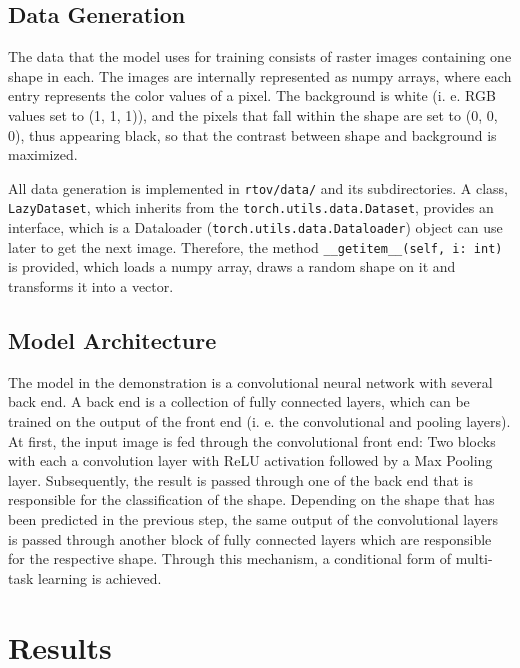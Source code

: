 \documentclass[12pt, a4paper, titlepage]{report}
\begin{document}
\section{Data Generation}

The data that the model uses for training consists of raster images containing one shape in each. The images are internally represented as numpy arrays, where each entry represents the color values of a pixel. The background is white (i. e. RGB values set to (1, 1, 1)), and the pixels that fall within the shape are set to (0, 0, 0), thus appearing black, so that the contrast between shape and background is maximized.

All data generation is implemented in \lstinline{rtov/data/} and its subdirectories. A class, \lstinline{LazyDataset}, which inherits from the \lstinline{torch.utils.data.Dataset}, provides an interface, which is a Dataloader (\lstinline{torch.utils.data.Dataloader}) object can use later to get the next image. Therefore, the method \lstinline{__getitem__(self, i: int)} is provided, which loads a numpy array, draws a random shape on it and transforms it into a vector.

\section{Model Architecture}

The model in the demonstration is a convolutional neural network with several back end. A back end is a collection of fully connected layers, which can be trained on the output of the front end (i. e. the convolutional and pooling layers). At first, the input image is fed through the convolutional front end: Two blocks with each a convolution layer with ReLU activation followed by a Max Pooling layer. Subsequently, the result is passed through one of the back end that is responsible for the classification of the shape. Depending on the shape that has been predicted in the previous step, the same output of the convolutional layers is passed through another block of fully connected layers which are responsible for the respective shape. Through this mechanism, a conditional form of multi-task learning is achieved.




\chapter{Results}
\end{document}
